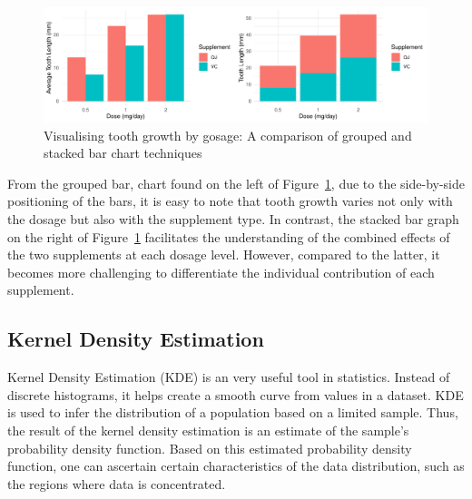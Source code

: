 \documentclass{article}\usepackage[]{graphicx}\usepackage[]{xcolor}
\makeatletter
\def\maxwidth{ %
  \ifdim\Gin@nat@width>\linewidth
    \linewidth
  \else
    \Gin@nat@width
  \fi
}
\newenvironment{kframe}{%
 \def\at@end@of@kframe{}%
 \ifinner\ifhmode%
  \def\at@end@of@kframe{\end{minipage}}%
  \begin{minipage}{\columnwidth}%
 \fi\fi%
 \def\FrameCommand##1{\hskip\@totalleftmargin \hskip-\fboxsep
 \colorbox{shadecolor}{##1}\hskip-\fboxsep
     \hskip-\linewidth \hskip-\@totalleftmargin \hskip\columnwidth}%
 \MakeFramed {\advance\hsize-\width
   \@totalleftmargin\z@ \linewidth\hsize
   \@setminipage}}%
 {\par\unskip\endMakeFramed%
 \at@end@of@kframe}
\newenvironment{knitrout}{}{} %
\numberwithin{equation}{section}
\makeatother
\begin{document}
\begin{knitrout}\scriptsize
{}\color{fgcolor}\begin{kframe}


{\ttfamily\noindent\itshape\color{messagecolor}{\#\# `summarise()` has grouped output by 'dose'. You can override using the\\\#\# `.groups` argument.}}\end{kframe}\begin{figure}[H]

{\centering \includegraphics[width=\maxwidth]{figure/beamer-barcharts-1} 

}

\caption[Visualising tooth growth by gosage]{Visualising tooth growth by gosage: A comparison of grouped and stacked bar chart techniques}\label{fig:barcharts}
\end{figure}

\end{knitrout}

\noindent From the grouped bar, chart found on the left of Figure~\ref{fig:barcharts}, due to the side-by-side positioning of the bars, it is easy to note that tooth growth varies not only with the dosage but also with the supplement type. In contrast, the stacked bar graph on the right of Figure~\ref{fig:barcharts} facilitates the understanding of the combined effects of the two supplements at each dosage level. However, compared to the latter, it becomes more challenging to differentiate the individual contribution of each supplement.

\subsection{Kernel Density Estimation}

Kernel Density Estimation (KDE) is an very useful tool in statistics. Instead of discrete histograms, it helps create a smooth curve from values in a dataset. KDE is used to infer the distribution of a population based on a limited sample. Thus, the result of the kernel density estimation is an estimate of the sample's probability density function. Based on this estimated probability density function, one can ascertain certain characteristics of the data distribution, such as the regions where data is concentrated.\\
\end{document}

